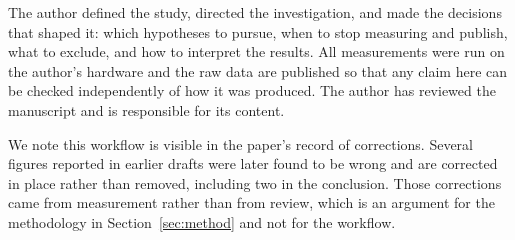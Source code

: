 \documentclass[11pt]{article}
\begin{document}
The author defined the study, directed the investigation, and made the
decisions that shaped it: which hypotheses to pursue, when to stop measuring and
publish, what to exclude, and how to interpret the results. All measurements were
run on the author's hardware and the raw data are published so that any claim
here can be checked independently of how it was produced. The author has reviewed
the manuscript and is responsible for its content.

We note this workflow is visible in the paper's record of corrections. Several
figures reported in earlier drafts were later found to be wrong and are corrected
in place rather than removed, including two in the conclusion. Those corrections
came from measurement rather than from review, which is an argument for the
methodology in Section~\ref{sec:method} and not for the workflow.



\end{document}
